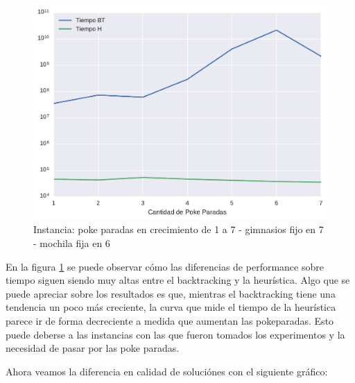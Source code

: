 \begin{figure}[H]
  \begin{center}
    \includegraphics[scale=0.8]{imagenes/ej2test2hvsbttiemposa.pdf}
    \caption{Instancia: poke paradas en crecimiento de 1 a 7 - gimnasios fijo en 7 - mochila fija en 6}
    \label{ej2test2a}
  \end{center}
\end{figure}

En la figura \ref{ej2test2a} se puede observar cómo las diferencias de performance sobre tiempo siguen siendo muy altas entre el backtracking y la heurística. Algo que se puede apreciar sobre los resultados es que, mientras el backtracking tiene una tendencia un poco más creciente, la curva que mide el tiempo de la heurística parece ir de forma decreciente a medida que aumentan las pokeparadas. Esto puede deberse a las instancias con las que fueron tomados los experimentos y la necesidad de pasar por las poke paradas.

Ahora veamos la diferencia en calidad de soluciónes con el siguiente gráfico:

